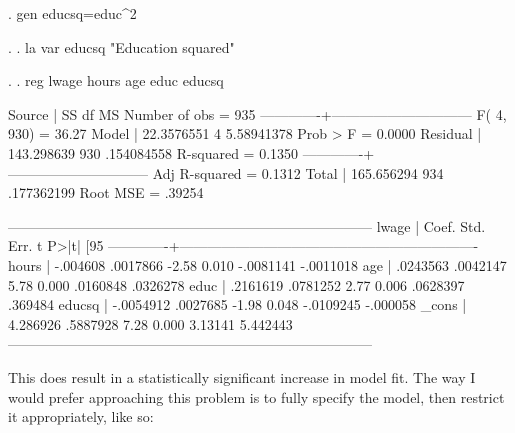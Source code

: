 \documentclass[12pt]{article}
\begin{document}
\begin{stlog}
  
. gen educsq=educ^2

. 
. la var educsq "Education squared"

. 
. reg lwage hours age educ educsq

      Source |       SS       df       MS              Number of obs =     935
-------------+------------------------------           F(  4,   930) =   36.27
       Model |  22.3576551     4  5.58941378           Prob > F      =  0.0000
    Residual |  143.298639   930  .154084558           R-squared     =  0.1350
-------------+------------------------------           Adj R-squared =  0.1312
       Total |  165.656294   934  .177362199           Root MSE      =  .39254

------------------------------------------------------------------------------
       lwage |      Coef.   Std. Err.      t    P>|t|     [95%
-------------+----------------------------------------------------------------
       hours |   -.004608   .0017866    -2.58   0.010    -.0081141   -.0011018
         age |   .0243563   .0042147     5.78   0.000     .0160848    .0326278
        educ |   .2161619   .0781252     2.77   0.006     .0628397     .369484
      educsq |  -.0054912   .0027685    -1.98   0.048    -.0109245    -.000058
       _cons |   4.286926   .5887928     7.28   0.000      3.13141    5.442443
------------------------------------------------------------------------------

\end{stlog}

This does result in a statistically significant increase in model
fit. The way I would prefer approaching this problem is to fully
specify the model, then restrict it appropriately, like so:
\end{document}

